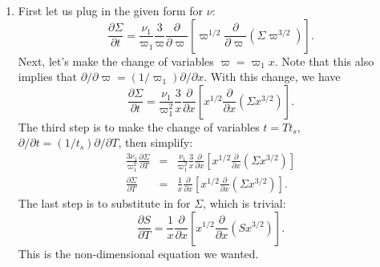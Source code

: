 \begin{enumerate}
\begin{enumerate}
\item First let us plug in the given form for $\nu$:
\begin{displaymath}
\frac{\partial\Sigma}{\partial t} = \frac{\nu_1}{\varpi_1} \frac{3}{\varpi} \frac{\partial}{\partial \varpi} \left[\varpi^{1/2} \frac{\partial}{\partial \varpi} \left(\Sigma \varpi^{3/2}\right)\right].
\end{displaymath}
Next, let's make the change of variables $\varpi = \varpi_1 x$. Note that this also implies that $\partial /\partial \varpi = (1/\varpi_1) \partial/\partial x$. With this change, we have
\begin{displaymath}
\frac{\partial\Sigma}{\partial t} = \frac{\nu_1}{\varpi_1^2} \frac{3}{x} \frac{\partial}{\partial x} \left[x^{1/2} \frac{\partial}{\partial x} \left(\Sigma x^{3/2}\right)\right].
\end{displaymath}
The third step is to make the change of variables $t = T t_s$, $\partial/\partial t = (1/t_s) \partial/\partial T$, then simplify:
\begin{eqnarray*}
\frac{3\nu_1}{\varpi_1^2} \frac{\partial\Sigma}{\partial T} & = & \frac{\nu_1}{\varpi_1^2} \frac{3}{x} \frac{\partial}{\partial x} \left[x^{1/2} \frac{\partial}{\partial x} \left(\Sigma x^{3/2}\right)\right] \\
\frac{\partial\Sigma}{\partial T} & = & \frac{1}{x} \frac{\partial}{\partial x} \left[x^{1/2} \frac{\partial}{\partial x} \left(\Sigma x^{3/2}\right)\right].
\end{eqnarray*}
The last step is to substitute in for $\Sigma$, which is trivial:
\begin{displaymath}
\frac{\partial S}{\partial T} = \frac{1}{x} \frac{\partial}{\partial x} \left[x^{1/2} \frac{\partial}{\partial x} \left(S x^{3/2}\right)\right].
\end{displaymath}
This is the non-dimensional equation we wanted.


\end{enumerate}
\end{enumerate}
